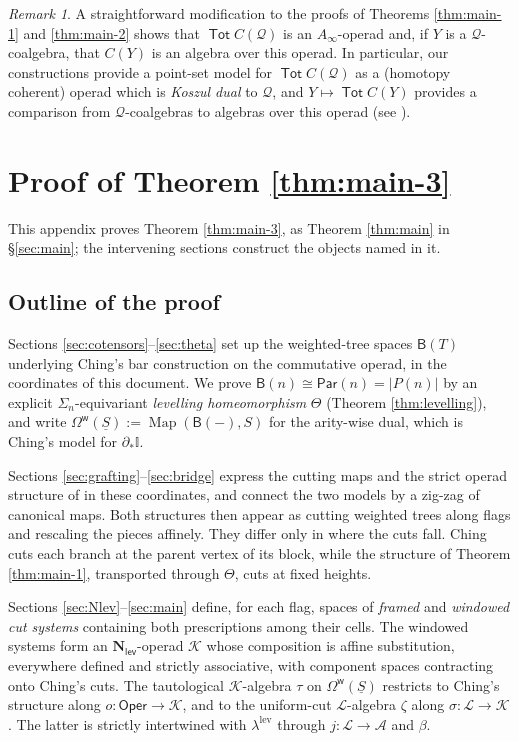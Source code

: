 \documentclass[12pt]{amsart}
\theoremstyle{definition}
\theoremstyle{remark}
\newtheorem{remark}[subsection]{Remark}
\newcommand{\Tot}{\operatorname{\mathsf{Tot}}}
\newcommand{\Oper}{\mathsf{Oper}}
\newcommand{\Map}{\operatorname{Map}}
\newcommand{\Id}{\mathbb{I}}
\newcommand{\Cal}[1]{\mathcal{#1}}
\newcommand{\Nl}{\mathbf{N}_{\mathsf{lev}}}
\newcommand{\uS}{\underline{S}}
\newcommand{\Par}{\mathsf{Par}}
\newcommand{\BC}{\mathsf{B}}                     %
\newcommand{\Omw}{\Omega^{\mathsf{w}}}           %
\newcommand{\Kop}{\mathcal{K}}                   %
\newcommand{\Lop}{\mathcal{L}}                   %
\newcommand{\Aop}{\mathcal{A}}                   %
\newcommand{\Thet}{\Theta}                       %
\begin{document}
\begin{remark}
    A straightforward modification to the proofs of Theorems \ref{thm:main-1} and \ref{thm:main-2} shows that $\Tot C(\Cal{Q})$ is an $A_{\infty}$-operad and, if $Y$ is a $\Cal{Q}$-coalgebra, that $C(Y)$ is an algebra over this operad. In particular, our constructions provide a point-set model for $\Tot C(\Cal{Q})$ as a (homotopy coherent) operad which is \textit{Koszul dual} to $\Cal{Q}$, and $Y\mapsto \Tot C(Y)$ provides a comparison from $\Cal{Q}$-coalgebras to algebras over this operad (see \cite{FG}). 
\end{remark}


\appendix

\section{Proof of Theorem \texorpdfstring{\ref{thm:main-3}}{1.3}}\label{app:comparison}

This appendix proves Theorem \ref{thm:main-3}, as Theorem \ref{thm:main} in \S\ref{sec:main}; the intervening sections construct the objects named in it.

\subsection{Outline of the proof}\label{sec:app-outline}
Sections \ref{sec:cotensors}--\ref{sec:theta} set up the weighted-tree spaces $\BC(T)$ underlying Ching's bar construction on the commutative operad, in the coordinates of this document. We prove $\BC(n)\cong\Par(n) = |P(n)|$ by an explicit $\Sigma_n$-equivariant \emph{levelling homeomorphism} $\Thet$ (Theorem \ref{thm:levelling}), and write $\Omw(\uS) := \Map(\BC(-),S)$ for the arity-wise dual, which is Ching's model for $\partial_*\Id$.

Sections \ref{sec:grafting}--\ref{sec:bridge} express the cutting maps and the strict operad structure of \cite{Ching-thesis} in these coordinates, and connect the two models by a zig-zag of canonical maps. Both structures then appear as cutting weighted trees along flags and rescaling the pieces affinely. They differ only in where the cuts fall. Ching cuts each branch at the parent vertex of its block, while the structure of Theorem \ref{thm:main-1}, transported through $\Thet$, cuts at fixed heights.

Sections \ref{sec:Nlev}--\ref{sec:main} define, for each flag, spaces of \emph{framed} and \emph{windowed cut systems} containing both prescriptions among their cells. The windowed systems form an $\Nl$-operad $\Kop$ whose composition is affine substitution, everywhere defined and strictly associative, with component spaces contracting onto Ching's cuts. The tautological $\Kop$-algebra $\tau$ on $\Omw(\uS)$ restricts to Ching's structure along $o\colon \Oper\to\Kop$, and to the uniform-cut $\Lop$-algebra $\zeta$ along $\sigma\colon\Lop\to\Kop$. The latter is strictly intertwined with $\lambda^{\mathrm{lev}}$ through $j\colon\Lop\to\Aop$ and $\beta$.
\end{document}
